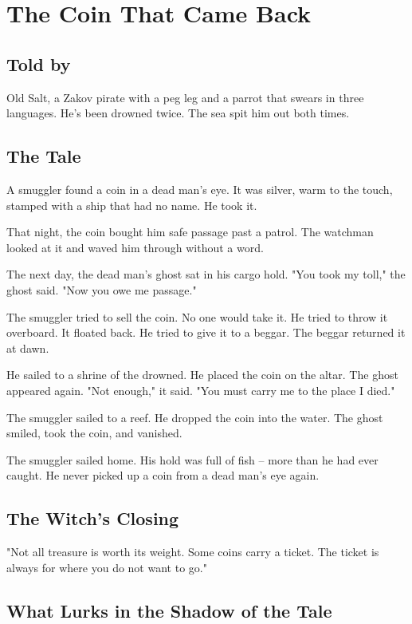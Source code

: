 \chapter{The Coin That Came Back}

\section*{Told by}
Old Salt, a Zakov pirate with a peg leg and a parrot that swears in three languages. He's been drowned twice. The sea spit him out both times.

\section*{The Tale}

A smuggler found a coin in a dead man's eye. It was silver, warm to the touch, stamped with a ship that had no name. He took it.

That night, the coin bought him safe passage past a patrol. The watchman looked at it and waved him through without a word.

The next day, the dead man's ghost sat in his cargo hold. "You took my toll," the ghost said. "Now you owe me passage."

The smuggler tried to sell the coin. No one would take it. He tried to throw it overboard. It floated back. He tried to give it to a beggar. The beggar returned it at dawn.

He sailed to a shrine of the drowned. He placed the coin on the altar. The ghost appeared again. "Not enough," it said. "You must carry me to the place I died."

The smuggler sailed to a reef. He dropped the coin into the water. The ghost smiled, took the coin, and vanished.

The smuggler sailed home. His hold was full of fish -- more than he had ever caught. He never picked up a coin from a dead man's eye again.

\section*{The Witch's Closing}
"Not all treasure is worth its weight. Some coins carry a ticket. The ticket is always for where you do not want to go."

\section*{What Lurks in the Shadow of the Tale}

